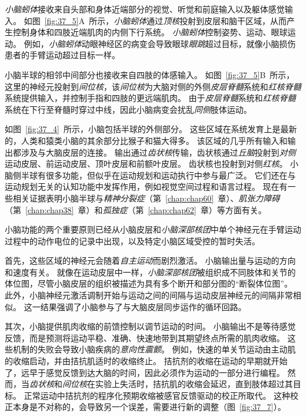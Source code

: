 \textit{小脑蚓体}接收来自头部和身体近端部分的视觉、听觉和前庭输入以及躯体感觉输入。
如图~\ref{fig:37_5}A~所示，\textit{小脑蚓体}通过\textit{顶核}投射到皮层和脑干区域，从而产生控制身体和四肢近端肌肉的内侧下行系统。
\textit{小脑蚓体}控制姿势、运动、眼球运动。
例如，\textit{小脑蚓体}动眼神经区的病变会导致眼球\textit{眼跳}超过目标，就像小脑损伤患者的手臂运动超过目标一样。


小脑半球的相邻中间部分也接收来自四肢的体感输入。
如图~\ref{fig:37_5}B~所示，这里的神经元投射到\textit{间位核}，该\textit{间位核}为大脑对侧的外侧\textit{皮层脊髓}系统和\textit{红核脊髓}系统提供输入，并控制手指和四肢的更远端肌肉。
由于\textit{皮层脊髓}系统和\textit{红核脊髓}系统在下行至脊髓时穿过中线，因此小脑病变会扰乱\textit{同侧}肢体运动。


如图~\ref{fig:37_4}~所示，小脑包括半球的外侧部分。
这些区域在系统发育上是最新的，人类和猿类小脑的其余部分比猴子和猫大得多。
该区域的几乎所有输入和输出都涉及与大脑皮层的连接。
输出通过\textit{齿状核}传输，齿状核通过\textit{丘脑}投射到\textit{对侧}运动皮层、前运动皮层、顶叶皮层和前额叶皮层。
齿状核也投射到对侧\textit{红核}。
小脑侧半球有很多功能，但似乎在运动规划和运动执行中参与最广泛。
它们还在与运动规划无关的认知功能中发挥作用，例如视觉空间过程和语言过程。
现在有一些相关证据表明小脑半球与\textit{精神分裂症}（第~\ref{chap:chap60}~章）、\textit{肌张力障碍}（第~\ref{chap:chap38}~章）和\textit{孤独症}（第~\ref{chap:chap62}~章）等方面有关。


小脑功能的两个重要原则已经从小脑皮层和\textit{小脑深部核团}中单个神经元在手臂运动过程中的动作电位的记录中出现，以及特定小脑区域受控的暂时失活。


首先，这些区域的神经元会随着\textit{自主运动}而剧烈激活。
小脑输出量与运动的方向和速度有关。
就像在运动皮层中一样，\textit{小脑深部核团}被组织成不同肢体和关节的体位图，尽管小脑皮层的组织被描述为具有多个断开和部分图的“断裂体位图”。
此外，小脑神经元激活调制开始与运动之间的间隔与运动皮层神经元的间隔非常相似。
这一结果强调了小脑参与了与大脑皮层同步运作的循环回路。


其次，小脑提供肌肉收缩的前馈控制以调节运动的时间。
小脑输出不是等待感觉反馈，而是预测将运动平稳、准确、快速地带到其期望终点所需的肌肉收缩。
这些机制的失败会导致小脑疾病的\textit{意向性震颤}。
例如，快速的单关节运动由主动肌的收缩启动，并由拮抗肌适时的收缩终止。
拮抗剂的收缩在运动的早期就开始了，远早于感觉反馈到达大脑的时间，因此必须作为运动的一部分进行编程。
然而，当\textit{齿状核}和\textit{间位核}在实验上失活时，拮抗肌的收缩会延迟，直到肢体超过其目标。
正常运动中拮抗剂的程序化预期收缩被感官反馈驱动的校正所取代。
这种校正本身是不对称的，会导致另一个误差，需要进行新的调整（图~\ref{fig:37_7}）。


